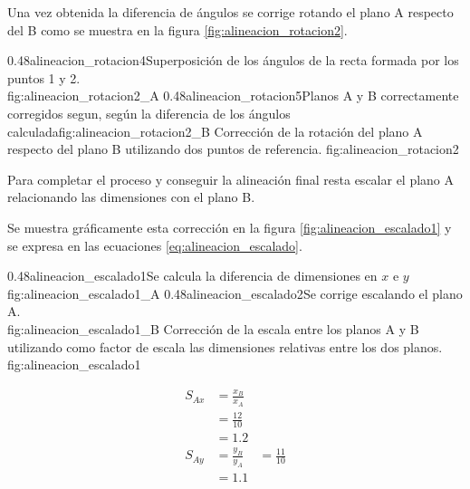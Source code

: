          Una vez obtenida la diferencia de ángulos se corrige rotando el plano A respecto del B como se muestra en la figura \ref{fig:alineacion_rotacion2}.

\subfigab
            {0.48}{alineacion_rotacion4}{Superposición de los ángulos de la recta formada por los puntos 1 y 2.\\ \vphantom{1}}{fig:alineacion_rotacion2_A}
            {0.48}{alineacion_rotacion5}{Planos A y B correctamente corregidos segun, según la diferencia de los ángulos calculada}{fig:alineacion_rotacion2_B}
            {Corrección de la rotación del plano A respecto del plano B utilizando dos puntos de referencia.}
            {fig:alineacion_rotacion2}

         Para completar el proceso y conseguir la alineación final resta escalar el plano A relacionando las dimensiones con el plano B.\par
         Se muestra gráficamente esta corrección en la figura \ref{fig:alineacion_escalado1} y se expresa en las ecuaciones \ref{eq:alineacion_escalado}.

\subfigab
         {0.48}{alineacion_escalado1}{Se calcula la diferencia de dimensiones en $x$ e $y$}{fig:alineacion_escalado1_A}
         {0.48}{alineacion_escalado2}{Se corrige escalando el plano A.\\ \vphantom{1}}{fig:alineacion_escalado1_B}
         {Corrección de la escala entre los planos A y B utilizando como factor de escala las dimensiones relativas entre los dos planos.}
         {fig:alineacion_escalado1}

         \begin{equation}
            \begin{aligned}
               S_{Ax} &= \frac{x_B}{x_A}\\
                      &= \frac{12}{10}\\
                      &= 1.2\\
               S_{Ay} &= \frac{y_B}{y_A}
                      &= \frac{11}{10}\\
                      &= 1.1\\
            \end{aligned}
            \label{eq:alineacion_escalado}
         \end{equation}

